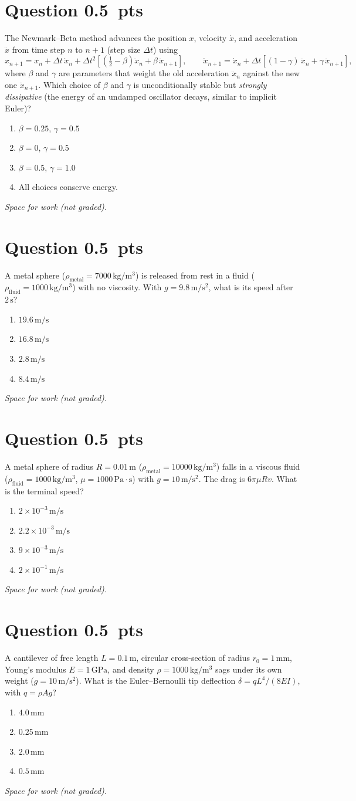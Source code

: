 \documentclass[letterpaper,11pt]{article}
\newcounter{qnum}
\newcommand{\qpts}{0.5}
\newcommand{\mcq}[5]{%
  \clearpage
  \stepcounter{qnum}%
  \section*{Question \theqnum \hfill \normalsize \qpts~pts}
  #1
  \begin{enumerate}[label=(\alph*)]
    \item #2
    \item #3
    \item #4
    \item #5
  \end{enumerate}
  \vspace{3mm}

  \textit{Space for work (not graded).}
}
\begin{document}
%
%
\mcq{The Newmark--Beta method advances the position $x$, velocity $\dot{x}$, and acceleration $\ddot{x}$ from time step $n$ to $n+1$ (step size $\Delta t$) using \[ x_{n+1} = x_n + \Delta t\, \dot{x}_n + \Delta t^2 \left[ \left( \tfrac{1}{2} - \beta \right) \ddot{x}_n + \beta\, \ddot{x}_{n+1} \right], \qquad \dot{x}_{n+1} = \dot{x}_n + \Delta t \left[ (1 - \gamma)\, \ddot{x}_n + \gamma\, \ddot{x}_{n+1} \right], \] where $\beta$ and $\gamma$ are parameters that weight the old acceleration $\ddot{x}_n$ against the new one $\ddot{x}_{n+1}$. Which choice of $\beta$ and $\gamma$ is unconditionally stable but \emph{strongly dissipative} (the energy of an undamped oscillator decays, similar to implicit Euler)?}
  {$\beta = 0.25$, $\gamma = 0.5$}
  {$\beta = 0$, $\gamma = 0.5$}
  {$\beta = 0.5$, $\gamma = 1.0$}
  {All choices conserve energy.}

%
%
\mcq{A metal sphere ($\rho_{\text{metal}} = 7000\,\mathrm{kg/m^3}$) is released from rest in a fluid ($\rho_{\text{fluid}} = 1000\,\mathrm{kg/m^3}$) with no viscosity. With $g = 9.8\,\mathrm{m/s^2}$, what is its speed after $2\,\mathrm{s}$?}
  {$19.6\,\mathrm{m/s}$}
  {$16.8\,\mathrm{m/s}$}
  {$2.8\,\mathrm{m/s}$}
  {$8.4\,\mathrm{m/s}$}

%
%
\mcq{A metal sphere of radius $R = 0.01\,\mathrm{m}$ ($\rho_{\text{metal}} = 10000\,\mathrm{kg/m^3}$) falls in a viscous fluid ($\rho_{\text{fluid}} = 1000\,\mathrm{kg/m^3}$, $\mu = 1000\,\mathrm{Pa \cdot s}$) with $g = 10\,\mathrm{m/s^2}$. The drag is $6\pi\mu R v$. What is the terminal speed?}
  {$2 \times 10^{-3}\,\mathrm{m/s}$}
  {$2.2 \times 10^{-3}\,\mathrm{m/s}$}
  {$9 \times 10^{-3}\,\mathrm{m/s}$}
  {$2 \times 10^{-1}\,\mathrm{m/s}$}

%
%
\mcq{A cantilever of free length $L = 0.1\,\mathrm{m}$, circular cross-section of radius $r_0 = 1\,\mathrm{mm}$, Young's modulus $E = 1\,\mathrm{GPa}$, and density $\rho = 1000\,\mathrm{kg/m^3}$ sags under its own weight ($g = 10\,\mathrm{m/s^2}$). What is the Euler--Bernoulli tip deflection $\delta = q L^4 / (8EI)$, with $q = \rho A g$?}
  {$4.0\,\mathrm{mm}$}
  {$0.25\,\mathrm{mm}$}
  {$2.0\,\mathrm{mm}$}
  {$0.5\,\mathrm{mm}$}
\end{document}
